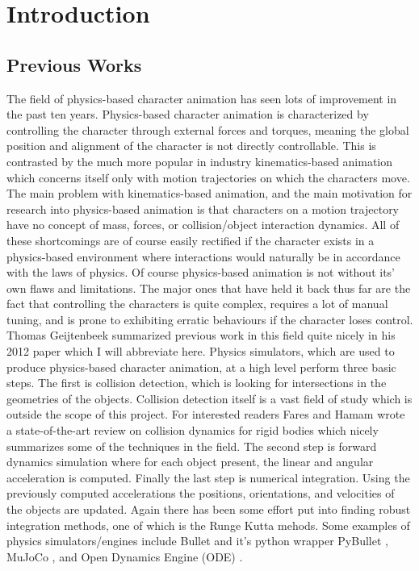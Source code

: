 \documentclass[12pt, a4paper]{article}
\begin{document}
\newpage
\section{Introduction}

\subsection{Previous Works}

The field of physics-based character animation has seen lots of improvement in the past ten years. Physics-based character animation is characterized by controlling the character through external forces and torques, meaning the global position and alignment of the character is not directly controllable. This is contrasted by the much more popular in industry kinematics-based animation which concerns itself only with motion trajectories on which the characters move. The main problem with kinematics-based animation, and the main motivation for research into physics-based animation is that characters on a motion trajectory have no concept of mass, forces, or collision/object interaction dynamics. All of these shortcomings are of course easily rectified if the character exists in a physics-based environment where interactions would naturally be in accordance with the laws of physics. Of course physics-based animation is not without its' own flaws and limitations. The major ones that have held it back thus far are the fact that controlling the characters is quite complex, requires a lot of manual tuning, and is prone to exhibiting erratic behaviours if the character loses control. \\

Thomas Geijtenbeek summarized previous work in this field quite nicely in his 2012 paper \cite{Geijtenbeek} which I will abbreviate here. Physics simulators, which are used to produce physics-based character animation, at a high level perform three basic steps. The first is collision detection, which is looking for intersections in the geometries of the objects. Collision detection itself is a vast field of study which is outside the scope of this project. For interested readers Fares and Hamam \cite{fares2005collision} 
wrote a state-of-the-art review on collision dynamics for rigid bodies which nicely summarizes some of the techniques in the field. The second step is forward dynamics simulation where for each object present, the linear and angular acceleration is computed. Finally the last step is numerical integration. Using the previously computed accelerations the positions, orientations, and velocities of the objects are updated. Again there has been some effort put into finding robust integration methods, one of which is the Runge Kutta mehods. Some examples of physics simulators/engines include Bullet and it's python wrapper PyBullet \cite{pybullet}, MuJoCo \cite{mujoco}, and Open Dynamics Engine (ODE) \cite{ode}.\\ 
\end{document}
